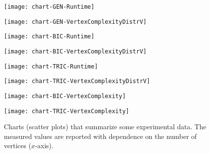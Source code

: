 \documentclass{article}
\begin{document}
 
\begin{figure}[t!]
    \centering
    \begin{minipage}[b]{.49\textwidth}
    	\centering
    	\texttt{[image: chart-GEN-Runtime]}
    	\label{ch:chart-GEN-Runtime}
    \end{minipage}
    \begin{minipage}[b]{.49\textwidth}
    	\centering
    	\texttt{[image: chart-GEN-VertexComplexityDistrV]}
    	\label{ch:chart-GEN-VertexComplexityDistrV}
    \end{minipage}    
    \begin{minipage}[b]{.49\textwidth}
    	\centering
    	\texttt{[image: chart-BIC-Runtime]}
    	\label{ch:chart-BIC-Runtime}
    \end{minipage}
   \begin{minipage}[b]{.49\textwidth}
    	\texttt{[image: chart-BIC-VertexComplexityDistrV]}
    	\label{ch:chart-BIC-VertexComplexityDistrV}
    \end{minipage}     
    \begin{minipage}[b]{.49\textwidth}
    	\centering
    	\texttt{[image: chart-TRIC-Runtime]}
    	\label{ch:chart-TRIC-Runtime}
    \end{minipage}
    \begin{minipage}[b]{.49\textwidth}
    	\texttt{[image: chart-TRIC-VertexComplexityDistrV]}
    	\label{ch:chart-TRIC-VertexComplexityDistrV}
    \end{minipage}
     \begin{minipage}[b]{.49\textwidth}
    	\centering
    	\texttt{[image: chart-BIC-VertexComplexity]}
    	\label{ch:chart-BIC-VertexComplexity}
    \end{minipage}
    \begin{minipage}[b]{.49\textwidth}
    	\centering
    	\texttt{[image: chart-TRIC-VertexComplexity]}
    	\label{ch:chart-TRIC-VertexComplexity}
    \end{minipage}        
    \caption{Charts (scatter plots) that summarize some experimental data. The measured values are reported with dependence on the number of vertices ($x$-axis).}\label{ch:all}
\end{figure}   
\end{document}
